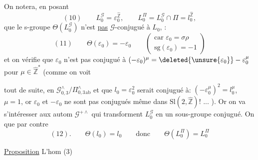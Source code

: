 On notera,  en posant
\[
(10)\qquad L_{0}^{\mathcal{G}}=\varepsilon_{0}^{\widehat{\mathbb{Z}}},\qquad
L_{0}^{\Pi}=L_{0}^{\mathcal{G}}\cap\Pi=l_{0}^{\widehat{\mathbb{Z}}},
\]
que le s-groupe $\Theta(L_{0}^{\mathcal{G}})$
n'est \uline{pas} $\mathcal{G}$-conjugué à $L_{0}$,
 
 
\deleted{\unsure{$\Theta\varepsilon$}} :
\[
(11)\qquad \Theta(\varepsilon_{0})=-\varepsilon_{0}
\qquad\left(\begin{gathered}
\text{car }\varepsilon_{0}=\sigma\rho\\
\mathrm{sg}(\varepsilon_{0})=-1
\end{gathered}\right)
\]
et on vérifie que $\varepsilon_{0}$ n'est pas conjugué à
$(-\varepsilon_{0})^{\mu}=\deleted{\unsure{\varepsilon_{0}}}-\varepsilon_{0}^{\mu}$
pour  $\mu\in\widehat{\mathbb{Z}}^{*}$ (comme on voit




tout de suite, en 
$\mathcal{G}_{0,3}^{\wedge}/\Pi_{0,3}^{\wedge}{}_{\mathrm{ab}}$
et  que $l_{0}=\varepsilon_{0}^{2}$ serait
conjugué à: $(-\varepsilon_{0}^{\mu})^{2}=l_{0}^{\mu}$,
 $\mu=1$, or
$\varepsilon_{0}$ et $-\varepsilon_{0}$ ne sont pas conjugués
même dans $\mathrm{Sl}(2,\widehat{\mathbb{Z}})$! ... ). Or on va
s'intéresser  aux autom 
$\mathcal{G}^{+\wedge}$ qui transforment $L_{0}^{\mathcal{G}}$ en un sous-groupe
conjugué. On  que par contre
\[
(12).\qquad \Theta(l_{0})=l_{0}\qquad\text{donc}\qquad
\Theta(L_{0}^{\Pi})=L_{0}^{\Pi}
\]

\uline{Proposition} L'hom (3)


